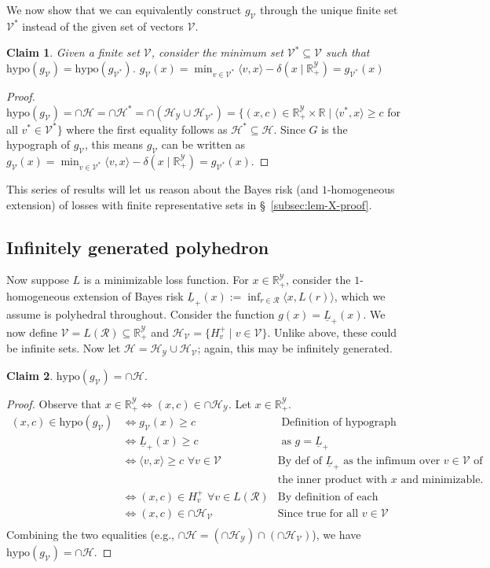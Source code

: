 \documentclass[11pt]{article}
\newcommand{\reals}{\mathbb{R}}
\renewcommand{\H}{\mathcal{H}}
\newcommand{\R}{\mathcal{R}}
\newcommand{\V}{\mathcal{V}}
\newcommand{\Y}{\mathcal{Y}}
\newcommand{\risk}[1]{\underline{#1}}
\newcommand{\inprod}[2]{\langle #1, #2 \rangle}%
\newcommand{\hyp}{\mathrm{hypo}}
\newtheorem{claim}{Claim}
\begin{document}
We now show that we can equivalently construct $g_\V$ through the unique finite set $\V^*$ instead of the given set of vectors $\V$.
\begin{claim}\label{claim:g-gen-by-Vstar}
	Given a finite set $\V$, consider the minimum set $\V^* \subseteq \V$ such that $\hyp(g_\V) = \hyp(g_{\V^*})$.
  $g_\V(x) = \min_{v \in \V^*}\inprod{v}{x} - \delta(x \mid \reals_+^\Y) = g_{\V^*}(x)$
\end{claim}
\begin{proof}
  $\hyp(g_\V) = \cap \H = \cap \H^* = \cap (\H_\Y \cup \H_{\V^*}) = \{(x,c) \in \reals_+^\Y \times \reals \mid \inprod{v^*}{x} \geq c$ for all $v^* \in \V^* \}$ where the first equality follows as $\H^* \subseteq \H$.
  Since $G$ is the hypograph of $g_\V$, this means $g_\V$ can be written as 
  $g_\V(x) = \min_{v \in \V^*}\inprod{v}{x} - \delta(x \mid \reals^\Y_+) = g_{\V^*}(x)$. 
\end{proof}

This series of results will let us reason about the Bayes risk (and $1$-homogeneous extension) of losses with finite representative sets in \S~\ref{subsec:lem-X-proof}.

\subsection{Infinitely generated polyhedron}\label{appsubsec:phase2}

Now suppose $L$ is a minimizable loss function.
For $x\in\reals^\Y_+$, consider the $1$-homogeneous extension of Bayes risk  $\risk{L}_+(x) := \inf_{r\in\R} \inprod{x}{L(r)}$, which we assume is polyhedral throughout.
Consider the function $g(x) = \risk{L}_+(x)$.
We now define $\V = L(\R) \subseteq \reals^\Y_+$ and $\H_{\V} = \{H_v^+ \mid v\in\V\}$.  
Unlike above, these could be infinite sets.  
Now let $\H = \H_\Y \cup \H_{\V}$; again, this may be infinitely generated.
\begin{claim}
	$\hyp(g_\V) = \cap\H$.
\end{claim}
\begin{proof}
	Observe that $x \in \reals^\Y_+ \iff (x, c) \in \cap \H_\Y$.
	Let $x \in \reals^\Y_+$.
	\begin{align*}
	(x,c) \in \hyp(g_\V)
	&\iff g_\V(x) \geq c & \text{ Definition of hypograph}\\
	&\iff \risk L_+(x) \geq c & \text{ as $g=\risk L_+$}\\
	&\iff \inprod{v}{x} \geq c \,\, \forall v \in \V & \text{By def of $\risk L_+$ as the infimum over $v \in \V$ of}\\
	& & \text{the inner product with $x$ and minimizable.} \\
	&\iff (x,c) \in H^+_{v} \,\, \forall v \in L(\R) & \text{By definition of each halfspace}\\
	&\iff (x,c) \in \cap \H_\V & \text{Since true for all $v \in \V$} \\ 
	\end{align*}
	Combining the two equalities (e.g., $\cap \H = (\cap \H_\Y) \cap (\cap \H_\V)$), we have $\hyp(g_\V) = \cap \H$.
	
\end{proof}
\end{document}
